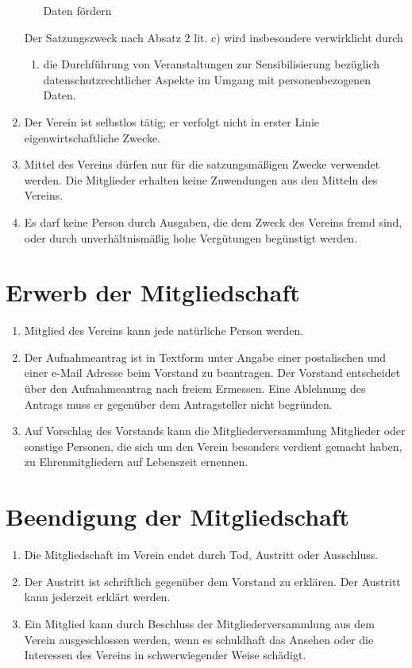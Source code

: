 \begin{enumerate}[label=(\arabic*)]
\begin{enumerate}[label=\alph*)]
                Daten fördern
        \end{enumerate}
        Der Satzungszweck nach Absatz 2 lit. c) wird insbesondere verwirklicht
        durch
        \begin{enumerate}[label=\alph*)]
            \item die Durchführung von Veranstaltungen zur Sensibilisierung bezüglich
                datenschutzrechtlicher Aspekte im Umgang mit personenbezogenen
                Daten.
        \end{enumerate}
    \item Der Verein ist selbstlos tätig; er verfolgt nicht in erster Linie
        eigenwirtschaftliche Zwecke.
    \item Mittel des Vereins dürfen nur für die satzungsmäßigen Zwecke
        verwendet werden. Die Mitglieder erhalten keine Zuwendungen aus den
        Mitteln des Vereins.
    \item Es darf keine Person durch Ausgaben, die dem Zweck des Vereins fremd
        sind, oder durch unverhältnismäßig hohe Vergütungen begünstigt werden.
\end{enumerate}

\section{Erwerb der Mitgliedschaft}
\begin{enumerate}[label=(\arabic*)]
    \item Mitglied des Vereins kann jede natürliche Person werden.
    \item Der Aufnahmeantrag ist in Textform unter Angabe einer postalischen und einer 
        e-Mail Adresse beim Vorstand zu beantragen. Der Vorstand entscheidet über den
        Aufnahmeantrag nach freiem Ermessen. Eine Ablehnung des Antrags muss
        er gegenüber dem Antragsteller nicht begründen.
    \item Auf Vorschlag des Vorstands kann die Mitgliederversammlung Mitglieder
        oder sonstige Personen, die sich um den Verein besonders verdient
        gemacht haben, zu Ehrenmitgliedern auf Lebenszeit ernennen.
\end{enumerate}

\section{Beendigung der Mitgliedschaft}
\begin{enumerate}[label=(\arabic*)]
    \item Die Mitgliedschaft im Verein endet durch Tod, Austritt oder Ausschluss.
    \item Der Austritt ist schriftlich gegenüber dem Vorstand zu erklären. Der
        Austritt kann jederzeit erklärt werden.
    \item Ein Mitglied kann durch Beschluss der Mitgliederversammlung aus dem
        Verein ausgeschlossen werden, wenn es schuldhaft das Ansehen oder die
        Interessen des Vereins in schwerwiegender Weise schädigt.
\end{enumerate}

